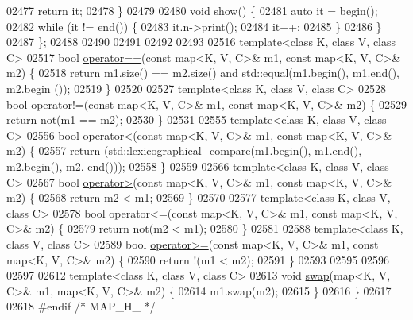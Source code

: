 \begin{DoxyCode}
02477         \textcolor{keywordflow}{return} it;
02478     \}
02479 
02480     \textcolor{keywordtype}{void} show() \{
02481         \textcolor{keyword}{auto} it = begin();
02482         \textcolor{keywordflow}{while} (it != end()) \{
02483             it.n->print();
02484             it++;
02485         \}
02486     \}
02487 \};
02488 
02490 
02491 
02492 
02493 
02516 \textcolor{keyword}{template}<\textcolor{keyword}{class} K, \textcolor{keyword}{class} V, \textcolor{keyword}{class} C>
02517 \textcolor{keywordtype}{bool} \hyperlink{classaed2_1_1map_abfc51b39670220e79037ac067006e933_abfc51b39670220e79037ac067006e933}{operator==}(\textcolor{keyword}{const} map<K, V, C>& m1, \textcolor{keyword}{const} map<K, V, C>& m2) \{
02518     \textcolor{keywordflow}{return} m1.size() == m2.size() and std::equal(m1.begin(), m1.end(), m2.begin
      ());
02519 \}
02520 
02527 \textcolor{keyword}{template}<\textcolor{keyword}{class} K, \textcolor{keyword}{class} V, \textcolor{keyword}{class} C>
02528 \textcolor{keywordtype}{bool} \hyperlink{classaed2_1_1map_abce0fa35c5b25fd67111c2e704616f09_abce0fa35c5b25fd67111c2e704616f09}{operator!=}(\textcolor{keyword}{const} map<K, V, C>& m1, \textcolor{keyword}{const} map<K, V, C>& m2) \{
02529     \textcolor{keywordflow}{return} not(m1 == m2);
02530 \}
02531 
02555 \textcolor{keyword}{template}<\textcolor{keyword}{class} K, \textcolor{keyword}{class} V, \textcolor{keyword}{class} C>
02556 \textcolor{keywordtype}{bool} operator<(const map<K, V, C>& m1, \textcolor{keyword}{const} map<K, V, C>& m2) \{
02557     \textcolor{keywordflow}{return} (std::lexicographical\_compare(m1.begin(), m1.end(), m2.begin(), m2.
      end()));
02558 \}
02559 
02566 \textcolor{keyword}{template}<\textcolor{keyword}{class} K, \textcolor{keyword}{class} V, \textcolor{keyword}{class} C>
02567 \textcolor{keywordtype}{bool} \hyperlink{classaed2_1_1map_a2000cd874b72034ce7fe730c811b6c63_a2000cd874b72034ce7fe730c811b6c63}{operator>}(\textcolor{keyword}{const} map<K, V, C>& m1, \textcolor{keyword}{const} map<K, V, C>& m2) \{
02568     \textcolor{keywordflow}{return} m2 < m1;
02569 \}
02570 
02577 \textcolor{keyword}{template}<\textcolor{keyword}{class} K, \textcolor{keyword}{class} V, \textcolor{keyword}{class} C>
02578 \textcolor{keywordtype}{bool} operator<=(const map<K, V, C>& m1, \textcolor{keyword}{const} map<K, V, C>& m2) \{
02579     \textcolor{keywordflow}{return} not(m2 < m1);
02580 \}
02581 
02588 \textcolor{keyword}{template}<\textcolor{keyword}{class} K, \textcolor{keyword}{class} V, \textcolor{keyword}{class} C>
02589 \textcolor{keywordtype}{bool} \hyperlink{classaed2_1_1map_a093a6d1a055339c5fc6297a1d47a9159_a093a6d1a055339c5fc6297a1d47a9159}{operator>=}(\textcolor{keyword}{const} map<K, V, C>& m1, \textcolor{keyword}{const} map<K, V, C>& m2) \{
02590     \textcolor{keywordflow}{return} !(m1 < m2);
02591 \}
02593 
02595 
02596 
02597 
02612 \textcolor{keyword}{template}<\textcolor{keyword}{class} K, \textcolor{keyword}{class} V, \textcolor{keyword}{class} C>
02613 \textcolor{keywordtype}{void} \hyperlink{classaed2_1_1map_a119cb2938bbc11c25ebd4fb824782a72_a119cb2938bbc11c25ebd4fb824782a72}{swap}(map<K, V, C>& m1, map<K, V, C>& m2) \{
02614     m1.swap(m2);
02615 \}
02616 \}
02617 
02618 \textcolor{preprocessor}{#endif }\textcolor{comment}{/* MAP\_H\_ */}
\end{DoxyCode}
